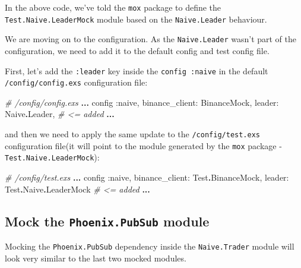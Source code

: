 \documentclass[
  oneside]{book}
\newenvironment{Shaded}{\begin{snugshade}}{\end{snugshade}}
\newcommand{\CommentTok}[1]{\textcolor[rgb]{0.56,0.35,0.01}{\textit{#1}}}
\newcommand{\ConstantTok}[1]{\textcolor[rgb]{0.56,0.35,0.01}{#1}}
\newcommand{\NormalTok}[1]{#1}
\newcommand{\OperatorTok}[1]{\textcolor[rgb]{0.81,0.36,0.00}{\textbf{#1}}}
\newcommand{\VariableTok}[1]{\textcolor[rgb]{0.00,0.00,0.00}{#1}}
\begin{document}
In the above code, we've told the \texttt{mox} package to define the \texttt{Test.Naive.LeaderMock} module based on the \texttt{Naive.Leader} behaviour.

We are moving on to the configuration. As the \texttt{Naive.Leader} wasn't part of the configuration, we need to add it to the default config and test config file.

First, let's add the \texttt{:leader} key inside the \texttt{config\ :naive} in the default \texttt{/config/config.exs} configuration file:

\begin{Shaded}
\begin{Highlighting}[]
\CommentTok{\# /config/config.exs}
\OperatorTok{...}
\NormalTok{config }\VariableTok{:naive}\NormalTok{,}
  \VariableTok{binance\_client:} \ConstantTok{BinanceMock}\NormalTok{,}
  \VariableTok{leader:} \ConstantTok{Naive}\OperatorTok{.}\ConstantTok{Leader}\NormalTok{,        }\CommentTok{\# \textless{}= added}
  \OperatorTok{...}
\end{Highlighting}
\end{Shaded}

and then we need to apply the same update to the \texttt{/config/test.exs} configuration file(it will point to the module generated by the \texttt{mox} package - \texttt{Test.Naive.LeaderMock}):

\begin{Shaded}
\begin{Highlighting}[]
\CommentTok{\# /config/test.exs}
\OperatorTok{...}
\NormalTok{config }\VariableTok{:naive}\NormalTok{,}
  \VariableTok{binance\_client:} \ConstantTok{Test}\OperatorTok{.}\ConstantTok{BinanceMock}\NormalTok{,}
  \VariableTok{leader:} \ConstantTok{Test}\OperatorTok{.}\ConstantTok{Naive}\OperatorTok{.}\ConstantTok{LeaderMock}     \CommentTok{\# \textless{}= added}
  \OperatorTok{...}
\end{Highlighting}
\end{Shaded}

\newpage

\subsection{\texorpdfstring{Mock the \texttt{Phoenix.PubSub} module}{Mock the Phoenix.PubSub module}}\label{mock-the-phoenix.pubsub-module}

Mocking the \texttt{Phoenix.PubSub} dependency inside the \texttt{Naive.Trader} module will look very similar to the last two mocked modules.
\end{document}
